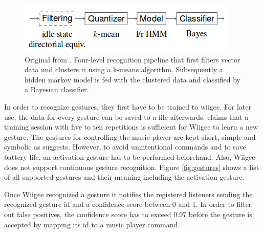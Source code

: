 \begin{figure}[bth]
	\myfloatalign
	\includegraphics[width=1\linewidth]{img/wiigeePipeline.png}
	\caption{Original from \cite{Schlomer:2008:GRW:1347390.1347395}. Four-level recognition pipeline that first filters vector data und clusters it using a k-means algorithm. Subsequently a hidden markov model is fed with the clustered data and classified by a Bayesian classifier.}
	\label{fig:wiigeePipeline}
\end{figure}

In order to recognize gestures, they first have to be trained to wiigee. For later use, the data for every gesture can be saved to a file afterwards. \cite{Schlomer:2008:GRW:1347390.1347395} claims that a training session with five to ten repetitions is sufficient for Wiigee to learn a new gesture. The gestures for controlling the music player are kept short, simple and symbolic as \cite{kuhnel2011m} suggests. However, to avoid unintentional commands and to save battery life, an activation gesture has to be performed beforehand. Also, Wiigee does not support continuous gesture recognition. Figure \ref{fig:gestures} shows a list of all supported gestures and their meaning including the activation gesture. 

Once Wiigee recognized a gesture it notifies the registered listeners sending the recognized gesture id and a confidence score between 0 and 1. In order to filter out false positives, the confidence score has to exceed 0.97 before the gesture is accepted by mapping its id to a music player command.

